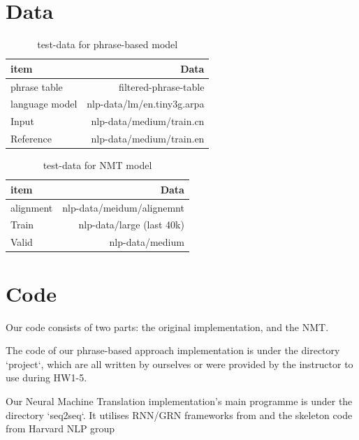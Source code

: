\documentclass[11pt,letterpaper]{article}
\begin{document}
\section{Data}

\begin{table}[h]
\begin{center}
\begin{tabular}{|l|r|}
\hline
item & \bf Data  \\ 
\hline
phrase table & filtered-phrase-table\\
language model	&	nlp-data/lm/en.tiny3g.arpa\\
Input		&	nlp-data/medium/train.cn\\
Reference	&	nlp-data/medium/train.en\\
\hline
\end{tabular}
\end{center}
\caption{\label{test-data-pb} test-data for phrase-based model }
\end{table}

\begin{table}[h]
\begin{center}
\begin{tabular}{|l|r|}
\hline
item & \bf Data  \\ 
\hline
alignment	&	nlp-data/meidum/alignemnt\\
Train		&	nlp-data/large (last 40k) \\
Valid		&	nlp-data/medium  \\

\hline
\end{tabular}
\end{center}
\caption{\label{NMT-data-pb} test-data for NMT model }
\end{table}

\section{Code}

Our code consists of two parts: the original implementation, and the NMT.

The code of our phrase-based approach implementation is under the directory `project`, which are all written by ourselves or were provided by the instructor to use during HW1-5.

Our Neural Machine Translation implementation’s main programme is under the directory `seq2seq`. It utilises RNN/GRN frameworks from \cite{RNN} and the skeleton code from Harvard NLP group \cite{seq2seq}
\end{document}
